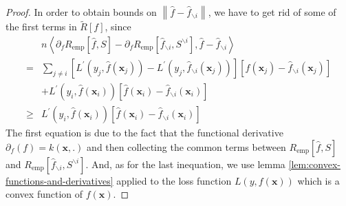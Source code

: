 \begin{proof}
	In order to obtain bounds on $\left\|\hat{f}-\hat{f}_{\backslash i}\right\|$, we have to get rid of some of the first terms in $\tilde{R}[f]$, since
	\begin{equation}
		\begin{aligned}
			     & n\left\langle\partial_{f}R_{\text{emp}}\left[\hat{f},S\right]-\partial_{f}R_{\text{emp}}\left[\hat{f}_{\backslash i},S^{\backslash i}\right],\hat{f}-\hat{f}_{\backslash i}\right\rangle                                       \\
			=    & \sum_{j\neq i}\left[L^{\prime}\left(y_{j},\hat{f}(\mathbf{x}_{j})\right)-L^{\prime}\left(y_{j},\hat{f}_{\backslash i}(\mathbf{x}_{j})\right)\right]\left[\hat{f}(\mathbf{x}_{j})-\hat{f}_{\backslash i}(\mathbf{x}_{j})\right] \\
			     & +L^{\prime}\left(y_{i},\hat{f}(\mathbf{x}_{i})\right)\left[\hat{f}(\mathbf{x}_{i})-\hat{f}_{\backslash i}(\mathbf{x}_{i})\right]                                                                                               \\
			\geq & L^{\prime}\left(y_{i},\hat{f}(\mathbf{x}_{i})\right)\left[\hat{f}(\mathbf{x}_{i})-\hat{f}_{\backslash i}(\mathbf{x}_{i})\right]
		\end{aligned}
	\end{equation}
	The first equation is due to the fact that the functional derivative $\partial_{f}(f)=k(\mathbf{x},.)$ and then collecting the common terms between $R_{\text{emp}}\left[\hat{f},S\right]$ and $R_{\text{emp}}\left[\hat{f}_{\backslash i},S^{\backslash i}\right]$. And, as for the last inequation, we use lemma \ref{lem:convex-functions-and-derivatives} applied to the loss function $L\left(y,f(\mathbf{x})\right)$ which is a convex function of $f(\mathbf{x})$.


\end{proof}
